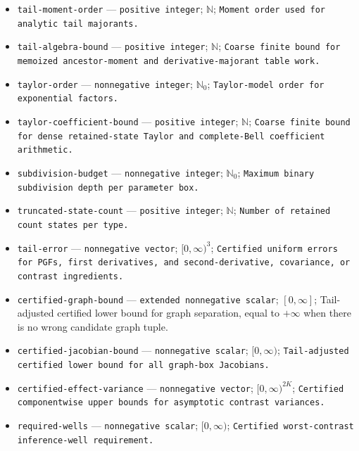 \documentclass{article}
\begin{document}
\begin{itemize}
  \item \texttt{tail-\allowbreak{}moment-\allowbreak{}order} --- \texttt{positive integer}; \(\mathbb N\); \texttt{Moment order used for analytic tail majorants.}
  \item \texttt{tail-\allowbreak{}algebra-\allowbreak{}bound} --- \texttt{positive integer}; \(\mathbb N\); \texttt{Coarse finite bound for memoized ancestor-\allowbreak{}moment and derivative-\allowbreak{}majorant table work.}
  \item \texttt{taylor-\allowbreak{}order} --- \texttt{nonnegative integer}; \(\mathbb N_0\); \texttt{Taylor-\allowbreak{}model order for exponential factors.}
  \item \texttt{taylor-\allowbreak{}coefficient-\allowbreak{}bound} --- \texttt{positive integer}; \(\mathbb N\); \texttt{Coarse finite bound for dense retained-\allowbreak{}state Taylor and complete-\allowbreak{}Bell coefficient arithmetic.}
  \item \texttt{subdivision-\allowbreak{}budget} --- \texttt{nonnegative integer}; \(\mathbb N_0\); \texttt{Maximum binary subdivision depth per parameter box.}
  \item \texttt{truncated-\allowbreak{}state-\allowbreak{}count} --- \texttt{positive integer}; \(\mathbb N\); \texttt{Number of retained count states per type.}
  \item \texttt{tail-\allowbreak{}error} --- \texttt{nonnegative vector}; \([0,\infty)^3\); \texttt{Certified uniform errors for PGFs,\allowbreak{} first derivatives,\allowbreak{} and second-\allowbreak{}derivative,\allowbreak{} covariance,\allowbreak{} or contrast ingredients.}
  \item \texttt{certified-\allowbreak{}graph-\allowbreak{}bound} --- \texttt{extended nonnegative scalar}; \([0,\infty]\); Tail-adjusted certified lower bound for graph separation, equal to \( +\infty\) when there is no wrong candidate graph tuple.
  \item \texttt{certified-\allowbreak{}jacobian-\allowbreak{}bound} --- \texttt{nonnegative scalar}; \([0,\infty)\); \texttt{Tail-\allowbreak{}adjusted certified lower bound for all graph-\allowbreak{}box Jacobians.}
  \item \texttt{certified-\allowbreak{}effect-\allowbreak{}variance} --- \texttt{nonnegative vector}; \([0,\infty)^{2K}\); \texttt{Certified componentwise upper bounds for asymptotic contrast variances.}
  \item \texttt{required-\allowbreak{}wells} --- \texttt{nonnegative scalar}; \([0,\infty)\); \texttt{Certified worst-\allowbreak{}contrast inference-\allowbreak{}well requirement.}

\end{itemize}
\end{document}
